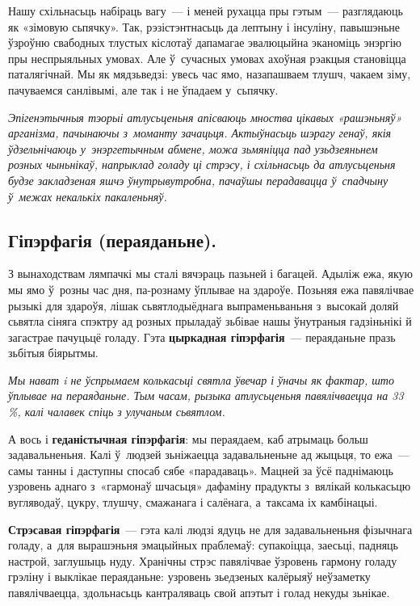 
Нашу схільнасьць набіраць вагу~--- і меней рухацца пры гэтым~--- разглядаюць як «зімовую сьпячку». Так, рэзістэнтнасьць да лептыну і інсуліну, павышэньне ўзроўню свабодных тлустых кіслотаў дапамагае эвалюцыйна эканоміць энэргію пры неспрыяльных умовах. Але ў~сучасных умовах ахоўная рэакцыя становіцца паталягічнай. Мы як мядзьведзі: увесь час ямо, назапашваем тлушч, чакаем зіму, пачуваемся санлівымі, але так і не ўпадаем у~сьпячку.

\emph{Эпігенэтычныя тэорыі атлусьценьня апісваюць мноства цікавых «рашэньняў» арганізма, пачынаючы з~моманту зачацьця. Актыўнасьць шэрагу генаў, якія ўдзельнічаюць у~энэргетычным абмене, можа зьмяніцца пад узьдзеяньнем розных чыньнікаў, напрыклад голаду ці стрэсу, і схільнасьць да атлусьценьня будзе закладзеная яшчэ ўнутрывутробна, пачаўшы перадавацца ў~спадчыну ў~межах некалькіх пакаленьняў.}

\subsection*{Гіпэрфагія (пераяданьне).}

З вынаходствам лямпачкі мы сталі вячэраць пазьней і багацей. Адыліж ежа, якую мы ямо ў~розны час дня, па-рознаму ўплывае на здароўе. Позьняя ежа павялічвае рызыкі для здароўя, лішак сьвятлодыёднага выпраменьваньня з~высокай доляй сьвятла сіняга спэктру ад розных прыладаў зьбівае нашы ўнутраныя гадзіньнікі й загастрае пачуцьцё голаду. Гэта \textbf{цыркадная гіпэрфагія}~--- пераяданьне празь зьбітыя біярытмы.

\emph{Мы нават i не ўспрымаем колькасьці святла ўвечар і ўначы як фактар, што ўплывае на пераяданьне. Тым часам, рызыка атлусьценьня павялічваецца на 33\,\%, калі чалавек спіць з улучаным сьвятлом.}

А вось і \textbf{геданістычная гіпэрфагія}: мы пераядаем, каб атрымаць больш задавальненьня. Калі ў~людзей зьніжаецца задавальненьне ад жыцьця, то ежа~--- самы танны і даступны спосаб сябе «парадаваць». Мацней за ўсё паднімаюць узровень аднаго з~«гармонаў шчасьця» дафаміну прадукты з~вялікай колькасьцю вугляводаў, цукру, тлушчу, смажанага і салёнага, а~таксама іх камбінацыі.

\textbf{Стрэсавая гіпэрфагія}~--- гэта калі людзі ядуць не для задавальненьня фізычнага голаду, а~для вырашэньня эмацыйных праблемаў: супакоіцца, заесьці, падняць настрой, заглушыць нуду. Хранічны стрэс павялічвае ўзровень гармону голаду грэліну і выклікае пераяданьне: узровень зьедзеных калёрыяў неўзаметку павялічваецца, здольнасьць кантраляваць свой апэтыт і голад некуды зьнікае.

